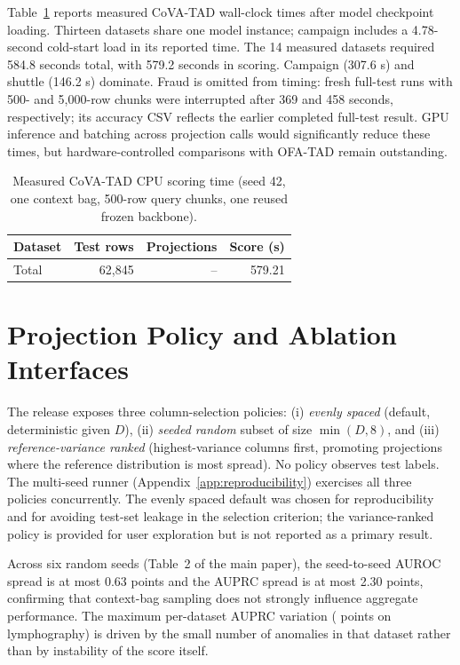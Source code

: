 \documentclass{article}
\begin{document}
Table~\ref{tab:cova-runtime} reports measured CoVA-TAD wall-clock times after model checkpoint loading. Thirteen datasets share one model instance; campaign includes a 4.78-second cold-start load in its reported time. The 14 measured datasets required 584.8 seconds total, with 579.2 seconds in scoring. Campaign (307.6 s) and shuttle (146.2 s) dominate. Fraud is omitted from timing: fresh full-test runs with 500- and 5{,}000-row chunks were interrupted after 369 and 458 seconds, respectively; its accuracy CSV reflects the earlier completed full-test result. GPU inference and batching across projection calls would significantly reduce these times, but hardware-controlled comparisons with OFA-TAD remain outstanding.

\begin{table}[h]
\centering
\caption{Measured CoVA-TAD CPU scoring time (seed 42, one context bag, 500-row query chunks, one reused frozen backbone).}
\label{tab:cova-runtime}
\small
\setlength{\tabcolsep}{8pt}
\begin{tabular}{lrrr}
\toprule
Dataset & Test rows & Projections & Score (s)\\
\midrule
%
Total & 62{,}845 & -- & 579.21\\
\bottomrule
\end{tabular}
\end{table}

\section{Projection Policy and Ablation Interfaces}
\label{app:ablations}

The release exposes three column-selection policies: (i) \emph{evenly spaced} (default, deterministic given $D$), (ii) \emph{seeded random} subset of size $\min(D, 8)$, and (iii) \emph{reference-variance ranked} (highest-variance columns first, promoting projections where the reference distribution is most spread). No policy observes test labels. The multi-seed runner (Appendix~\ref{app:reproducibility}) exercises all three policies concurrently. The evenly spaced default was chosen for reproducibility and for avoiding test-set leakage in the selection criterion; the variance-ranked policy is provided for user exploration but is not reported as a primary result.

Across six random seeds (Table~2 of the main paper), the seed-to-seed AUROC spread is at most 0.63 points and the AUPRC spread is at most 2.30 points, confirming that context-bag sampling does not strongly influence aggregate performance. The maximum per-dataset AUPRC variation (\seedMaxAUPRC{} points on lymphography) is driven by the small number of anomalies in that dataset rather than by instability of the score itself.
\end{document}
